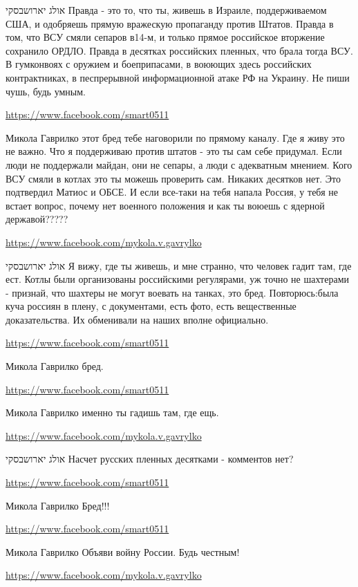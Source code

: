 \documentclass[a4paper,11pt]{extreport}
\begin{document}
\begin{itemize}
\begin{itemize}
אולג יארושבסקי Правда - это то, что ты, живешь в Израиле, поддерживаемом США, и одобряешь прямую вражескую пропаганду против Штатов. Правда в том, что ВСУ смяли сепаров в14-м, и только прямое российское вторжение сохранило ОРДЛО. Правда в десятках российских пленных, что брала тогда ВСУ. В гумконвоях с оружием и боеприпасами, в воюющих здесь российских контрактниках, в песпрерывной информационной атаке РФ на Украину. Не пиши чушь, будь умным.

\url{https://www.facebook.com/smart0511}

Микола Гаврилко этот бред тебе наговорили по прямому каналу. Где я живу это не важно. Что я поддерживаю против штатов - это ты сам себе придумал. Если люди не поддержали майдан, они не сепары, а люди с адекватным мнением. Кого ВСУ смяли в котлах это ты можешь проверить сам. Никаких десятков нет. Это подтвердил Матиос и ОБСЕ. И если все-таки на тебя напала Россия, у тебя не встает вопрос, почему нет военного положения и как ты воюешь с ядерной державой?????

\url{https://www.facebook.com/mykola.v.gavrylko}

אולג יארושבסקי Я вижу, где ты живешь, и мне странно, что человек гадит там, где ест. Котлы были организованы российскими регулярами, уж точно не шахтерами - признай, что шахтеры не могут воевать на танках, это бред. Повторюсь:была куча россиян в плену, с документами, есть фото, есть вещественные доказательства. Их обменивали на наших вполне официально.

\url{https://www.facebook.com/smart0511}

Микола Гаврилко бред.

\url{https://www.facebook.com/smart0511}

Микола Гаврилко именно ты гадишь там, где ещь.

\url{https://www.facebook.com/mykola.v.gavrylko}

אולג יארושבסקי Насчет русских пленных десятками - комментов нет?

\url{https://www.facebook.com/smart0511}

Микола Гаврилко Бред!!!

\url{https://www.facebook.com/smart0511}

Микола Гаврилко Объяви войну России. Будь честным!

\url{https://www.facebook.com/mykola.v.gavrylko}


\end{itemize}
\end{itemize}
\end{document}

